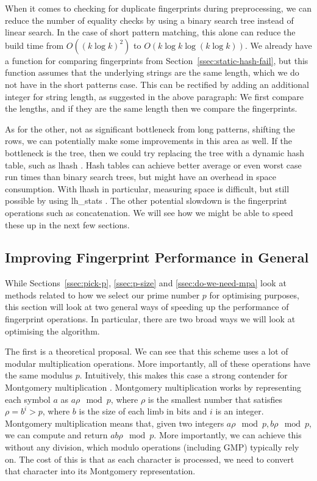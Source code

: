\documentclass[ %
                    author={Dominic Joseph Moylett},
                    degree={MEng},
                     title={Dictionary Matching with Fingerprints},
                  subtitle={An Empirical Analysis},
                      type={research},
                      year={2015} ]{dissertation}
\begin{document}
When it comes to checking for duplicate fingerprints during preprocessing, we can reduce the number of equality checks by using a binary search tree instead of linear search. In the case of short pattern matching, this alone can reduce the build time from $O((k\log k)^2)$ to $O(k\log k\log(k\log k))$. We already have a function for comparing fingerprints from Section~\ref{ssec:static-hash-fail}, but this function assumes that the underlying strings are the same length, which we do not have in the short patterns case. This can be rectified by adding an additional integer for string length, as suggested in the above paragraph: We first compare the lengths, and if they are the same length then we compare the fingerprints.

As for the other, not as significant bottleneck from long patterns, shifting the rows, we can potentially make some improvements in this area as well. If the bottleneck is the tree, then we could try replacing the tree with a dynamic hash table, such as lhash \cite{website:openssl-lhash}. Hash tables can achieve better average or even worst case run times than binary search trees, but might have an overhead in space consumption. With lhash in particular, measuring space is difficult, but still possible by using lh\_stats \cite{website:openssl-lhstats}. The other potential slowdown is the fingerprint operations such as concatenation. We will see how we might be able to speed these up in the next few sections.

\subsection{Improving Fingerprint Performance in General}

While Sections~\ref{ssec:pick-p}, \ref{ssec:p-size} and \ref{ssec:do-we-need-mpa} look at methods related to how we select our prime number $p$ for optimising purposes, this section will look at two general ways of speeding up the performance of fingerprint operations. In particular, there are two broad ways we will look at optimising the algorithm.

The first is a theoretical proposal. We can see that this scheme uses a lot of modular multiplication operations. More importantly, all of these operations have the same modulus $p$. Intuitively, this makes this case a strong contender for Montgomery multiplication \cite{montgomery:multiplication}. Montgomery multiplication works by representing each symbol $a$ as $a\rho \mod p$, where $\rho$ is the smallest number that satisfies $\rho = b^i > p$, where $b$ is the size of each limb in bits and $i$ is an integer. Montgomery multiplication means that, given two integers $a\rho\mod p, b\rho\mod p$, we can compute and return $ab\rho\mod p$. More importantly, we can achieve this without any division, which modulo operations (including GMP) typically rely on. The cost of this is that as each character is processed, we need to convert that character into its Montgomery representation.
\end{document}
